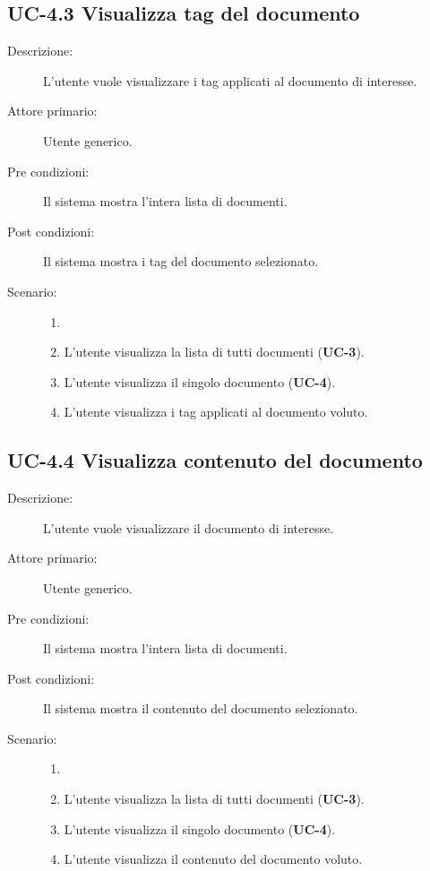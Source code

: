 \subsection{UC-4.3 Visualizza tag del documento}
\begin{description}
    \item[Descrizione:] L'utente vuole visualizzare i tag applicati al documento di interesse.
    \item[Attore primario:] Utente generico.
    \item[Pre condizioni:] Il sistema mostra l’intera lista di documenti.
    \item[Post condizioni:] Il sistema mostra i tag del documento selezionato.
    \item[Scenario:]
    \begin{enumerate}
        \item[]
        \item L’utente visualizza la lista di tutti documenti (\textbf{UC-3}).
        \item L'utente visualizza il singolo documento (\textbf{UC-4}).
        \item L'utente visualizza i tag applicati al documento voluto.
    \end{enumerate}
\end{description}

\subsection{UC-4.4 Visualizza contenuto del documento}
\begin{description}
    \item[Descrizione:] L'utente vuole visualizzare il documento di interesse.
    \item[Attore primario:] Utente generico.
    \item[Pre condizioni:] Il sistema mostra l’intera lista di documenti.
    \item[Post condizioni:] Il sistema mostra il contenuto del documento selezionato.
    \newpage
    \item[Scenario:]
    \begin{enumerate}
        \item[]
        \item L’utente visualizza la lista di tutti documenti (\textbf{UC-3}).
        \item L'utente visualizza il singolo documento (\textbf{UC-4}).
        \item L'utente visualizza il contenuto del documento voluto.
    \end{enumerate}
\end{description}

